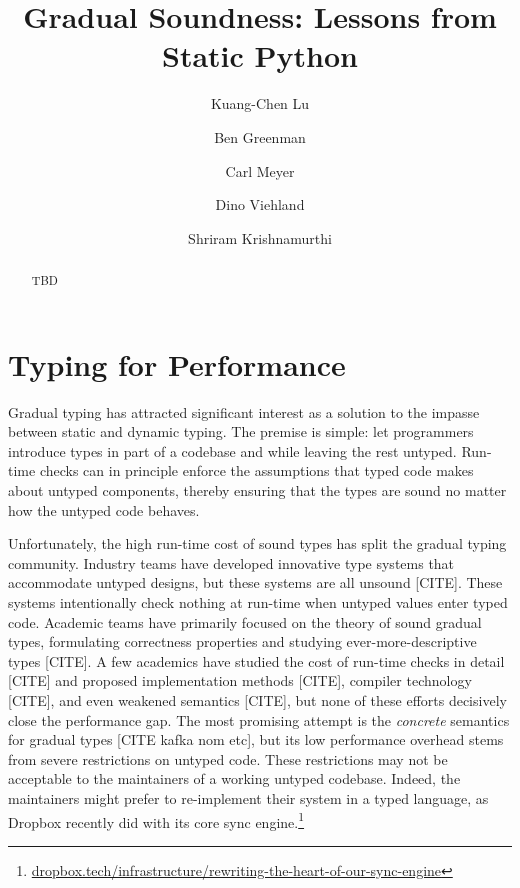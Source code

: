 \documentclass[a4paper,english,cleveref,autoref,thm-restate,anonymous,]{lipics-v2021}
\title{Gradual Soundness: Lessons from Static Python}
\author{Kuang-Chen Lu}{Department of Computer Science, Brown University, USA}{LuKuangchen1024@gmail.com}{}{}
\author{Ben Greenman}{Department of Computer Science, Brown University, USA}{benjamin.l.greenman@gmail.com}{0000-0001-7078-9287}{}
\author{Carl Meyer}{Facebook, Inc.}{carljm@fb.com}{}{}
\author{Dino Viehland}{Facebook, Inc.}{dinoviehland@fb.com}{}{}
\author{Shriram Krishnamurthi}{Department of Computer Science, Brown University, USA}{shriram@brown.edu}{0000-0001-5184-1975}{}
\begin{document}
\maketitle

\newcommand{\shorturl}[2]{\href{#1#2}{#2}}
\newcommand{\SP}{Static Python}
\newcommand{\code}[1]{\texttt{#1}}


\begin{abstract}
  TBD
\end{abstract}


\section{Typing for Performance}
\label{s:intro}

Gradual typing has attracted significant interest as a solution to
the impasse between static and dynamic typing.
The premise is simple: let programmers introduce types in part of a
codebase and while leaving the rest untyped.
Run-time checks can in principle enforce the assumptions that
typed code makes about untyped components, thereby ensuring that
the types are sound no matter how the untyped code behaves.

Unfortunately, the high run-time cost of sound types has split
the gradual typing community.
Industry teams have developed innovative type systems that accommodate
untyped designs, but these systems are all unsound [CITE].
These systems intentionally check nothing at run-time when untyped values enter
typed code.
Academic teams have primarily focused on the theory of sound
gradual types, formulating correctness properties and studying ever-more-descriptive types [CITE].
A few academics have studied the cost of run-time checks
in detail [CITE] and proposed implementation methods [CITE],
compiler technology [CITE],
and even weakened semantics [CITE], but none of these efforts
decisively close the performance gap.
The most promising attempt is the \emph{concrete} semantics
for gradual types [CITE kafka nom etc], but its low performance
overhead stems from severe restrictions on untyped code.
These restrictions may not be acceptable to the maintainers of a
working untyped codebase.
Indeed, the maintainers might prefer to re-implement their system
in a typed language, as Dropbox recently did with its core sync
engine.\footnote{\shorturl{https://}{dropbox.tech/infrastructure/rewriting-the-heart-of-our-sync-engine}}
\end{document}
